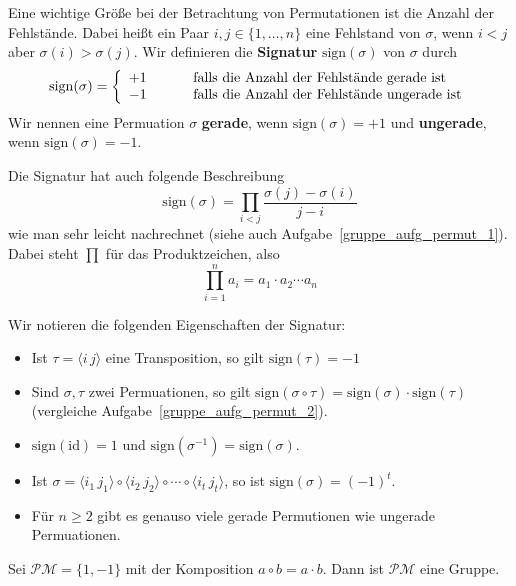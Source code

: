 \begin{beispiel}
Eine wichtige Größe bei der Betrachtung von Permutationen ist die Anzahl der Fehlstände. Dabei 
heißt ein Paar $i, j \in \{ 1, \ldots , n\}$ eine Fehlstand von $\sigma$, wenn $i < j$ aber
$\sigma(i) > \sigma(j)$. Wir definieren die \textbf{Signatur} 
$\mathrm{sign}(\sigma)$ von $\sigma$ durch
  	$$ \mathrm{sign}(\sigma) = \left\{ \begin{array} {l c l}
		+1 & \quad &\textrm{ falls die Anzahl der Fehlstände gerade ist} \\
		-1 & \quad &\textrm{ falls die Anzahl der Fehlstände ungerade ist} 
	\end{array} \right. $$
Wir nennen eine Permuation $\sigma$ \textbf{gerade}, wenn $\mathrm{sign}(\sigma) = +1$ und \textbf{ungerade}, 
wenn $\mathrm{sign}(\sigma) = -1$.

Die Signatur hat auch folgende Beschreibung
  	$$ \mathrm{sign}(\sigma) = \prod_{i<j} \frac {\sigma(j) - \sigma(i)}{j - i} $$
wie man sehr leicht nachrechnet (siehe auch Aufgabe~\ref{gruppe_aufg_permut_1}). Dabei steht 
$\prod$ für das Produktzeichen, also
  	$$ \prod_{i=1}^n a_i = a_1 \cdot a_2 \cdots a_n $$

Wir notieren die folgenden Eigenschaften der Signatur:

\begin{itemize}
\item Ist $\tau = \langle i \, j \rangle$ eine Transposition, so gilt $\textrm{sign}(\tau) = -1$
\item Sind $\sigma, \tau$ zwei Permuationen, so gilt $\textrm{sign}(\sigma \circ \tau) = 
\textrm{sign}(\sigma) \cdot \textrm{sign}(\tau)$ (vergleiche Aufgabe~\ref{gruppe_aufg_permut_2}).
\item $\textrm{sign}(\textrm{id}) = 1$ und $\textrm{sign}(\sigma^{-1}) = \textrm{sign}(\sigma)$.
\item Ist $\sigma = \langle i_1 \, j_1 \rangle \circ \langle i_2 \, j_2 \rangle \circ \cdots \circ 
           \langle i_t \, j_t \rangle$, so ist $\textrm{sign}(\sigma) = (-1)^t$.
\item Für $n \geq 2$ gibt es genauso viele gerade Permutionen wie ungerade Permuationen.
\end{itemize}
\end{beispiel} 

\bigbreak

\begin{beispiel}\label{gruppe_pm} 
Sei $\mathcal{PM} = \{1, -1\}$ mit der Komposition $a \circ b = a \cdot b$. 
Dann ist $\mathcal{PM}$ eine Gruppe.
\end{beispiel}


